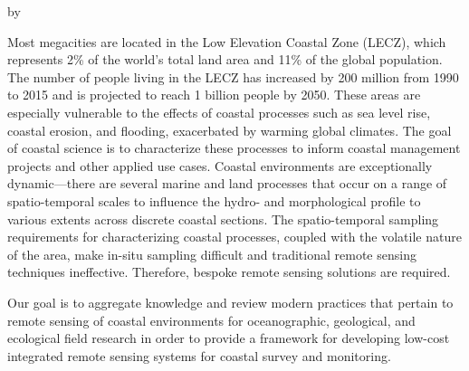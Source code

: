 \documentclass{article}
\begin{document}

\newpage
{}
\thispagestyle{fancy}
\begin{center}
\vspace{1cm}
\par{\thetitle}
\vspace{1cm}
\par{by}
\vspace{1cm}
\par{\theauthor}
\vspace{1cm}
\end{center}
\doublespacing

\par{Most megacities are located in the Low Elevation Coastal Zone (LECZ), which represents 2\% of the world’s total land area and 11\% of the global population. The number of people living in the LECZ has increased by 200 million from 1990 to 2015 and is projected to reach 1 billion people by 2050. These areas are especially vulnerable to the effects of coastal processes such as sea level rise, coastal erosion, and flooding, exacerbated by warming global climates. The goal of coastal science is to characterize these processes to inform coastal management projects and other applied use cases. Coastal environments are exceptionally dynamic---there are several marine and land processes that occur on a range of spatio-temporal scales to influence the hydro- and morphological profile to various extents across discrete coastal sections. The spatio-temporal sampling requirements for characterizing coastal processes, coupled with the volatile nature of the area, make in-situ sampling difficult and traditional remote sensing techniques ineffective. Therefore, bespoke remote sensing solutions are required.}

\par{Our goal is to aggregate knowledge and review modern practices that pertain to remote sensing of coastal environments for oceanographic, geological, and ecological field research in order to provide a framework for developing low-cost integrated remote sensing systems for coastal survey and monitoring.}
\end{document}

